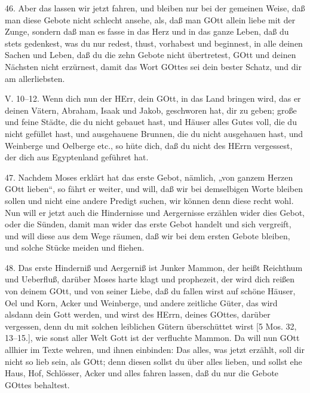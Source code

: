 46. Aber das lassen wir jetzt fahren, und bleiben nur bei der gemeinen Weise, daß man diese Gebote nicht schlecht ansehe, als, daß man GOtt allein liebe mit der Zunge, sondern daß man es fasse in das Herz und in das ganze Leben, daß du stets gedenkest, was du nur redest, thust, vorhabest und beginnest, in alle deinen Sachen und Leben, daß du die zehn Gebote nicht übertretest, GOtt und deinen Nächsten nicht erzürnest, damit das Wort GOttes sei dein bester Schatz, und dir am allerliebsten.

\begin{schriftzitat}
V. 10–12. Wenn dich nun der HErr, dein GOtt, in das Land bringen wird, das er deinen Vätern, Abraham, Isaak und Jakob, geschworen hat, dir zu geben; große und feine Städte, die du nicht gebauet hast, und Häuser alles Gutes voll, die du nicht gefüllet hast, und ausgehauene Brunnen, die du nicht ausgehauen hast, und Weinberge und Oelberge etc., so hüte dich, daß du nicht des HErrn vergessest, der dich aus Egyptenland geführet hat.
\end{schriftzitat}

47. Nachdem Moses erklärt hat das erste Gebot, nämlich, „von ganzem Herzen GOtt lieben“, so fährt er weiter, und will, daß wir bei demselbigen Worte bleiben sollen und nicht eine andere Predigt suchen, wir können denn diese recht wohl. Nun will er jetzt auch die Hindernisse und Aergernisse erzählen wider dies Gebot, oder die Sünden, damit man wider das erste Gebot handelt und sich vergreift, und will diese aus dem Wege räumen, daß wir bei dem ersten Gebote bleiben, und solche Stücke meiden und fliehen.

48. Das erste Hinderniß und Aergerniß ist Junker Mammon, der heißt Reichthum und Ueberfluß, darüber Moses harte klagt und prophezeit, der wird dich reißen von deinem GOtt, und von seiner Liebe, daß du fallen wirst auf schöne Häuser, Oel und Korn, Acker und Weinberge, und andere zeitliche Güter, das wird alsdann dein Gott werden, und wirst des HErrn, deines GOttes, darüber vergessen, denn du mit solchen leiblichen Gütern überschüttet wirst [5 Mos. 32, 13–15.], wie sonst aller Welt Gott ist der verfluchte Mammon. Da will nun GOtt allhier im Texte wehren, und ihnen einbinden: Das alles, was jetzt erzählt, soll dir nicht so lieb
sein, als GOtt; denn diesen sollst du über alles lieben, und sollst ehe Haus, Hof, Schlösser, Acker und alles fahren lassen, daß du nur die Gebote GOttes behaltest.

